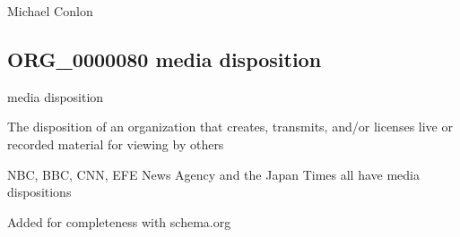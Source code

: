 \documentclass[letterpaper,10pt,english]{sphinxmanual}
\begin{document}
\begin{sphinxShadowBox}

\sphinxAtStartPar
Michael Conlon 
\end{sphinxShadowBox}
\begin{quote}

\ignorespaces \end{quote}


\subsection{ORG\_0000080 \sphinxhyphen{} media disposition}
\label{\detokenize{doc-ORG_0000080:org-0000080-media-disposition}}\label{\detokenize{doc-ORG_0000080:index-0}}\label{\detokenize{doc-ORG_0000080::doc}}
\begin{sphinxShadowBox}

\sphinxAtStartPar
media disposition
\end{sphinxShadowBox}

\begin{sphinxShadowBox}

\sphinxAtStartPar
The disposition of an organization that creates, transmits, and/or licenses live or recorded material for viewing by others
\end{sphinxShadowBox}

\begin{sphinxShadowBox}

\sphinxAtStartPar
{}
\end{sphinxShadowBox}

\begin{sphinxShadowBox}

\sphinxAtStartPar
NBC, BBC, CNN, EFE News Agency and the Japan Times all have media dispositions
\end{sphinxShadowBox}

\begin{sphinxShadowBox}

\sphinxAtStartPar
Added for completeness with schema.org
\end{sphinxShadowBox}
\end{document}
